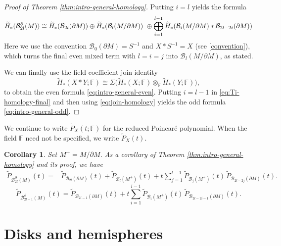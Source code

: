 \documentclass[11pt,a4paper]{article}
\numberwithin{equation}{section}
\newtheorem{cor}[thm]{Corollary}
\theoremstyle{definition}
\theoremstyle{remark}
\newcommand{\F}{\mathbb{F}}
\newcommand{\pa}{\partial}
\newcommand{\wt}{\widetilde}
\newcommand{\BB}{\mathcal B}
\begin{document}
\begin{proof}[Proof of Theorem \ref{thm:intro-general-homology}]
Putting \(i=l\) yields the formula
$$\wt H_*(\BB_{2l}^{\pa}(M))
\cong
\wt H_*(\BB_{2l}(\pa M))
\oplus
\wt H_*(\BB_l(M/\pa M))
\notag\ \oplus
\bigoplus_{i=1}^{l-1}
\wt H_*(\BB_i(M/\pa M)*\BB_{2l-2i}(\pa M))
$$
Here we use the convention \(\BB_0(\pa M)=S^{-1}\) and $X*S^{-1} = X$ (see \eqref{convention}), which turns the final even mixed term with $l=i=j$ into \(\BB_l(M/\pa M)\), as stated. 

We can finally use the field-coefficient join identity
\begin{equation}\label{eq:join-homology}
\wt H_*(X*Y;\F)
\cong
\Sigma\bigl(\wt H_*(X;\F)\otimes_{\F}\wt H_*(Y;\F)\bigr),
\end{equation}
to obtain the even formula \eqref{eq:intro-general-even}.
Putting \(i=l-1\) in \eqref{eq:Ti-homology-final} and then using \eqref{eq:join-homology} yields the odd formula \eqref{eq:intro-general-odd}.  
\end{proof}

We continue to write $\wt P_X(t;\F)$ for the reduced Poincar\'e
polynomial. When the field $\F$ need not be specified, we write
$\wt P_X(t)$.

\begin{cor}\label{poincarepolynomial} 
Set $M^+ = M/\pa M$. As a corollary of Theorem \ref{thm:intro-general-homology} and its proof, we have
\begin{equation*}
\begin{aligned}
\widetilde P_{\BB_{2l}^{\partial}(M)}(t)
={}&
\widetilde P_{\BB_{2l}(\pa M)}(t)
+
\widetilde P_{\BB_l(M^+)}(t)+
t\sum_{j=1}^{l-1}
\widetilde P_{\BB_j(M^+)}(t)\,
\widetilde P_{\BB_{2l-2j}(\pa M)}(t).
\end{aligned}
\end{equation*}
\begin{equation*}
\widetilde P_{\BB_{2l-1}^{\partial}(M)}(t)
=
\widetilde P_{\BB_{2l-1}(\partial M)}(t)
+
t\sum_{i=1}^{l-1}
\widetilde P_{\BB_i(M^+)}(t)\,
\widetilde P_{\BB_{2l-2i-1}(\partial M)}(t).
\end{equation*}
\end{cor}



\section{Disks and hemispheres}
\label{sec:hemispheres}
\end{document}

